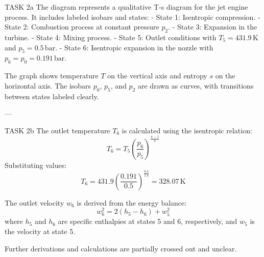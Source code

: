 TASK 2a  
The diagram represents a qualitative T-s diagram for the jet engine process. It includes labeled isobars and states:  
- State 1: Isentropic compression.  
- State 2: Combustion process at constant pressure \( p_2 \).  
- State 3: Expansion in the turbine.  
- State 4: Mixing process.  
- State 5: Outlet conditions with \( T_5 = 431.9 \, \text{K} \) and \( p_5 = 0.5 \, \text{bar} \).  
- State 6: Isentropic expansion in the nozzle with \( p_6 = p_0 = 0.191 \, \text{bar} \).  

The graph shows temperature \( T \) on the vertical axis and entropy \( s \) on the horizontal axis. The isobars \( p_0 \), \( p_5 \), and \( p_2 \) are drawn as curves, with transitions between states labeled clearly.  

---

TASK 2b  
The outlet temperature \( T_6 \) is calculated using the isentropic relation:  
\[
T_6 = T_5 \left( \frac{p_6}{p_5} \right)^{\frac{\kappa - 1}{\kappa}}
\]  
Substituting values:  
\[
T_6 = 431.9 \left( \frac{0.191}{0.5} \right)^{\frac{0.4}{1.4}} = 328.07 \, \text{K}
\]  

The outlet velocity \( w_6 \) is derived from the energy balance:  
\[
w_6^2 = 2 \left( h_5 - h_6 \right) + w_5^2
\]  
where \( h_5 \) and \( h_6 \) are specific enthalpies at states 5 and 6, respectively, and \( w_5 \) is the velocity at state 5.  

Further derivations and calculations are partially crossed out and unclear.